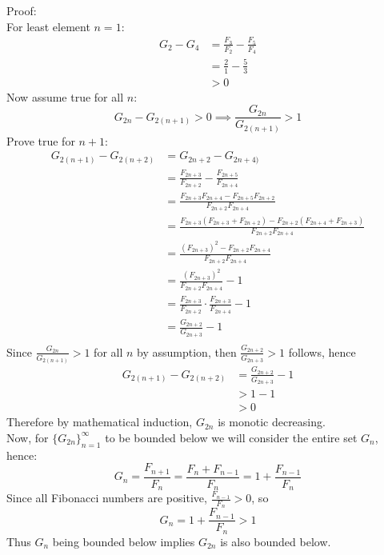 \documentclass[a4paper,11pt,twoside]{article}
\begin{document}
Proof: \\
For least element \(n = 1\):\\
\begin{align*}
    G_2 - G_4 &= \frac{F_3}{F_2} - \frac{F_5}{F_4}\\
    &= \frac{2}{1} - \frac{5}{3}\\
    &> 0
\end{align*}
Now assume true for all \(n\):\\
\begin{equation*}
    G_{2n} - G_{2(n+1)} > 0 \implies \frac{G_{2n}}{G_{2(n+1)}} > 1
\end{equation*}
Prove true for \(n+1\):
\begin{align*}
    G_{2(n+1)} - G_{2(n+2)} &= G_{2n + 2} - G_{2n+4)}\\
    &= \frac{F_{2n+3}}{F_{2n+2}} - \frac{F_{2n+5}}{F_{2n+4}}\\
    &= \frac{F_{2n+3}F_{2n+4} - F_{2n+5}F_{2n+2}}{F_{2n+2}F_{2n+4}}\\
    &= \frac{F_{2n+3}(F_{2n+3}+F_{2n+2}) - F_{2n+2}(F_{2n+4}+F_{2n+3})}{F_{2n+2}F_{2n+4}}\\
    &= \frac{(F_{2n+3})^2 - F_{2n+2}F_{2n+4}}{F_{2n+2}F_{2n+4}}\\
    &= \frac{(F_{2n+3})^2}{F_{2n+2}F_{2n+4}} - 1\\
    &= \frac{F_{2n+3}}{F_{2n+2}} \cdot \frac{F_{2n+3}}{F_{2n+4}} -1\\
    &= \frac{G_{2n+2}}{G_{2n+3}} - 1\\
\end{align*}
Since \(\frac{G_{2n}}{G_{2(n+1)}} > 1\) for all \(n\) by assumption, then \(\frac{G_{2n+2}}{G_{2n+3}} > 1\)  follows, hence
\begin{align*}
    G_{2(n+1)} - G_{2(n+2)} &= \frac{G_{2n+2}}{G_{2n+3}} - 1\\
    &> 1 -1\\
    &> 0
\end{align*}
Therefore by mathematical induction, \(G_{2n}\) is monotic decreasing.\\
Now, for \(\{G_{2n}\}_{n=1}^\infty\) to be bounded below we will consider the entire set \(G_n\), hence:
\begin{equation*}
    G_n = \frac{F_{n+1}}{F_n} =  \frac{F_n + F_{n-1}}{F_n} = 1 + \frac{F_{n-1}}{F_n}
\end{equation*}
Since all Fibonacci numbers are positive, \(\frac{F_{n-1}}{F_n} > 0\), so
\begin{equation*}
    G_n = 1 + \frac{F_{n-1}}{F_n} > 1
\end{equation*}
Thus \(G_n\) being bounded below implies \(G_{2n}\) is also bounded below.
\end{document}
